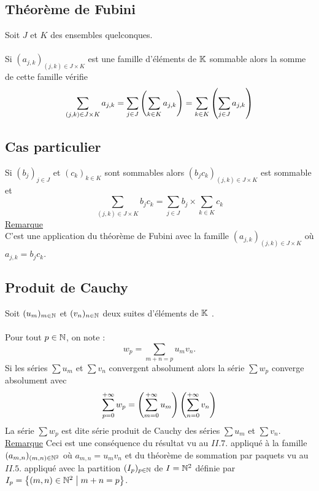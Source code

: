 \subsection{Théorème de Fubini}
\begin{defprop}
    Soit \(J\) et \(K\)   des ensembles quelconques.\\~\\
    Si \((a_{j,k})_{(j,k)\in J\times K}\)  est une famille d’éléments de \(\mathbb{K}\) sommable alors la somme de cette famille vérifie
    \[\sum_{(j,k)\in J\times K}a_{j,k} = \sum_{j\in J}\left(\sum_{k\in K} a_{j,k}\right)= \sum_{k\in K}\left(\sum_{j\in J} a_{j,k}\right)\]
\end{defprop}
\subsection{Cas particulier}
\begin{defprop}
    Si \((b_j)_{j\in J}\) et \((c_k)_{k\in K}\)  sont sommables alors \((b_j c_k)_{(j,k)\in J\times K}\) est sommable et
    \[\sum_{(j,k)\in J\times K}b_j c_k = \sum_{j\in J}b_j \times \sum_{k\in K}c_k\]
    \underline{Remarque}\\
    C’est une application du théorème de Fubini avec la famille \((a_{j,k})_{(j,k)\in J\times K}\)  où \(a_{j,k} = b_j c_k\).
\end{defprop}
\subsection{Produit de Cauchy}
\begin{defprop}
    Soit \((u_m)_{m\in \mathbb{N}}\) et \((v_n)_{n\in \mathbb{N}}\) deux suites d’éléments de \(\mathbb{K}\)  .\\~\\
    Pour tout \(p \in  \mathbb{N}\), on note :
    \[w_p = \sum_{m+n=p}u_mv_n.\]
    Si les séries \(\sum u_m\) et \(\sum v_n\) convergent absolument alors la série \(\sum w_p\) converge absolument avec
    \[\sum^{+\infty}_{p=0}w_p =\left(\sum^{+\infty}_{m=0}u_m\right)\left(\sum^{+\infty}_{n=0}v_n\right)\]
    La série \(\sum w_p\) est dite série produit de Cauchy des séries \(\sum u_m\) et \(\sum v_n\).\\
    \underline{Remarque}
    Ceci est une conséquence du résultat vu au \(II. 7.\) appliqué à la famille \((a_{m,n})_{(m,n)\in \mathbb{N}^2}\) où \(a_{m,n} = u_mv_n\) et du théorème de sommation par paquets vu au \(II. 5.\) appliqué avec la partition \((I_p)_{p\in \mathbb{N}}\) de \(I = \mathbb{N}^2\) définie par \(I_p = \left\lbrace(m, n) \in  \mathbb{N}^2\;\middle|\; m + n = p\right\rbrace\).
\end{defprop}